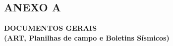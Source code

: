 \clearpage
\vspace*{\fill}
\begin{center}
    \section*{ANEXO A}
    \textbf{DOCUMENTOS GERAIS} \\
    \textbf{(ART, Planilhas de campo e Boletins Sísmicos)}
\end{center}
\vspace*{\fill}
\clearpage
\newpage


